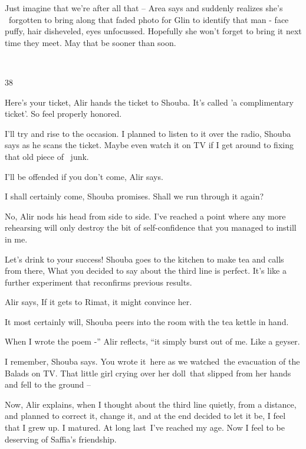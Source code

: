 \documentclass[letterpaper]{article}
\begin{document}
{\textquotedbl}Just imagine that we're after all that --{\textquotedbl} Area says and suddenly realizes she's
\ forgotten to bring along that faded photo for Glin to identify that man - face puffy, hair disheveled, eyes
unfocussed. Hopefully she won't forget to bring it next time they meet. May that be sooner than soon.

~

38 

{\textquotedbl}Here's your ticket,{\textquotedbl} Alir hands the ticket to Shouba. {\textquotedbl}It's called 'a
complimentary ticket'. So feel properly honored.{\textquotedbl} 

{\textquotedbl}I'll try and rise to the occasion. I planned to listen to it over the radio,{\textquotedbl} Shouba says
as he scans the ticket. {\textquotedbl}Maybe even watch it on TV if I get around to fixing that old piece of
~junk.{\textquotedbl} 

{\textquotedbl}I'll be offended if you don't come,{\textquotedbl} Alir says. 

{\textquotedbl}I shall certainly come,{\textquotedbl} Shouba promises. {\textquotedbl}Shall we run through it
again?{\textquotedbl} 

{\textquotedbl}No,{\textquotedbl} Alir nods his head from side to side. {\textquotedbl}I've reached a point where any
more rehearsing will only destroy the bit of self-confidence that you managed to instill in me.{\textquotedbl} 

{\textquotedbl}Let's drink to your success!{\textquotedbl} Shouba goes to the kitchen to make tea and calls from there,
{\textquotedbl}What you decided to say about the third line is perfect. It's like a further experiment that reconfirms
previous results.{\textquotedbl} 

Alir says, {\textquotedbl}If it gets to Rimat, it might convince her.{\textquotedbl} 

{\textquotedbl}It most certainly will,{\textquotedbl} Shouba peers into the room with the tea kettle in hand. 

{\textquotedbl}When I wrote the poem -'' Alir reflects, ``it simply burst out of me. Like a geyser.{\textquotedbl} 

{\textquotedbl}I remember,{\textquotedbl} Shouba says. {\textquotedbl}You wrote it~here as we watched~the evacuation of
the Balads on TV. That little girl crying over her doll~that slipped from her hands and fell to the ground
--{\textquotedbl} 

{\textquotedbl}Now,{\textquotedbl} Alir explains, {\textquotedbl}when I thought about the third line quietly, from a
distance, and planned to correct it, change it, and at the end decided to let it be, I feel that I grew up. I matured.
At long last~I've reached my age. Now I feel to be deserving of Saffia's friendship.{\textquotedbl} 
\end{document}
